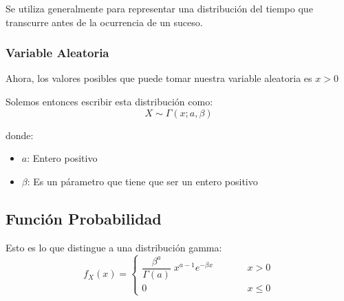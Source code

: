 \documentclass[12pt, fleqn]{report}                             %
\DeclareMathOperator \MegaSpace {\quad \quad}                   %
\theoremstyle{break}                                            %
\begin{document}
                Se utiliza generalmente para representar una distribución del tiempo
                que transcurre antes de la ocurrencia de un suceso.


                \vspace{1em}
                \subsubsection{Variable Aleatoria}

                    Ahora, los valores posibles que puede tomar nuestra variable aleatoria es
                    $x > 0$

                    Solemos entonces escribir esta distribución como:
                    \begin{equation*}
                        X \sim \Gamma(x; a, \beta)
                    \end{equation*}

                    donde:
                    \begin{itemize}
                        \item $a$: Entero positivo
                        \item $\beta$: Es un párametro que tiene que ser un entero positivo
                    \end{itemize}
      
            \clearpage
            \subsection{Función Probabilidad}

                Esto es lo que distingue a una distribución gamma:
                \begin{equation*}
                    f_X(x) = 
                        \begin{cases}
                            \dfrac{\beta^a}{\Gamma(a)} \; x^{a - 1} e^{-\beta x}    \MegaSpace & x > 0           \\
                            0                                                       \MegaSpace & x \leq 0
                        \end{cases}
                \end{equation*}
\end{document}

